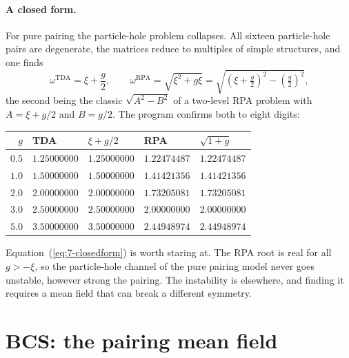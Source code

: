 \paragraph{A closed form.}
For pure pairing the particle-hole problem collapses.  All sixteen
particle-hole pairs are degenerate, the matrices reduce to multiples of simple
structures, and one finds
\begin{equation}
  \omega^{\mathrm{TDA}} = \xi + \frac{g}{2},
  \qquad
  \omega^{\mathrm{RPA}} = \sqrt{\xi^2+g\xi}
   = \sqrt{\left(\xi+\tfrac{g}{2}\right)^2-\left(\tfrac{g}{2}\right)^2},
  \label{eq:7-closedform}
\end{equation}
the second being the classic $\sqrt{A^2-B^2}$ of a two-level RPA problem with
$A=\xi+g/2$ and $B=g/2$.  The program confirms both to eight digits:

\begin{center}
\renewcommand{\arraystretch}{1.2}
\begin{tabular}{rllll}
\toprule
$g$ & TDA & $\xi+g/2$ & RPA & $\sqrt{1+g}$\\
\midrule
$0.5$ & $1.25000000$ & $1.25000000$ & $1.22474487$ & $1.22474487$\\
$1.0$ & $1.50000000$ & $1.50000000$ & $1.41421356$ & $1.41421356$\\
$2.0$ & $2.00000000$ & $2.00000000$ & $1.73205081$ & $1.73205081$\\
$3.0$ & $2.50000000$ & $2.50000000$ & $2.00000000$ & $2.00000000$\\
$5.0$ & $3.50000000$ & $3.50000000$ & $2.44948974$ & $2.44948974$\\
\bottomrule
\end{tabular}
\end{center}

Equation~(\ref{eq:7-closedform}) is worth staring at.  The RPA root is real
for all $g>-\xi$, so the particle-hole channel of the pure pairing model never
goes unstable, however strong the pairing.  The instability is elsewhere, and
finding it requires a mean field that can break a different symmetry.

\section{BCS: the pairing mean field}
\label{sec:bcs}

